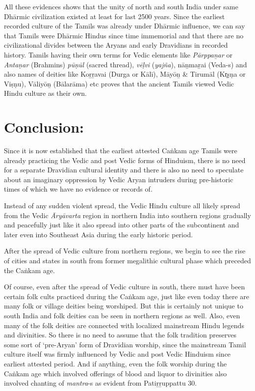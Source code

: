 All these evidences shows that the unity of north and south India under same Dhārmic civilization existed at least for last 2500 years. Since the earliest recorded culture of the Tamils was already under Dhārmic influence, we can say that Tamils were Dhārmic Hindus since time immemorial and that there are no civilizational divides between the Aryans and early Dravidians in recorded history. Tamils having their own terms for Vedic elements like \textit{Pārppaṉar} or \textit{Antaṇar} (Brahmins) \textit{pūṇūl} (sacred thread), \textit{vēḷvi} (\textit{yajña}), nāṉmaṟai (Veda-s) and also names of deities like Koṟṟavai (Durga or Kālī), Māyōṉ \& Tirumāl (Kr̥ṣṇa or Viṣṇu), Vāliyōṉ (Bālarāma) etc proves that the ancient Tamils viewed Vedic Hindu culture as their own.


\section*{Conclusion:}

Since it is now established that the earliest attested Caṅkam age Tamils were already practicing the Vedic and post Vedic forms of Hinduism, there is no need for a separate Dravidian cultural identity and there is also no need to speculate about an imaginary oppression by Vedic Aryan intruders during pre-historic times of which we have no evidence or records of.

Instead of any sudden violent spread, the Vedic Hindu culture all likely spread from the Vedic \textit{Āryāvarta} region in northern India into southern regions gradually and peacefully just like it also spread into other parts of the subcontinent and later even into Southeast Asia during the early historic period.

After the spread of Vedic culture from northern regions, we begin to see the rise of cities and states in south from former megalithic cultural phase which preceded the Caṅkam age.

Of course, even after the spread of Vedic culture in south, there must have been certain folk cults practiced during the Caṅkam age, just like even today there are many folk or village deities being worshiped. But this is certainly not unique to south India and folk deities can be seen in northern regions as well. Also, even many of the folk deities are connected with localized mainstream Hindu legends and divinities. So there is no need to assume that the folk tradition preserves some sort of ‘pre-Aryan’ form of Dravidian worship, since the mainstream Tamil culture itself was firmly influenced by Vedic and post Vedic Hinduism since earliest attested period. And if anything, even the folk worship during the Caṅkam age which involved offerings of blood and liquor to divinities also involved chanting of \textit{mantra}-s as evident from Patiṟṟuppattu 30.

